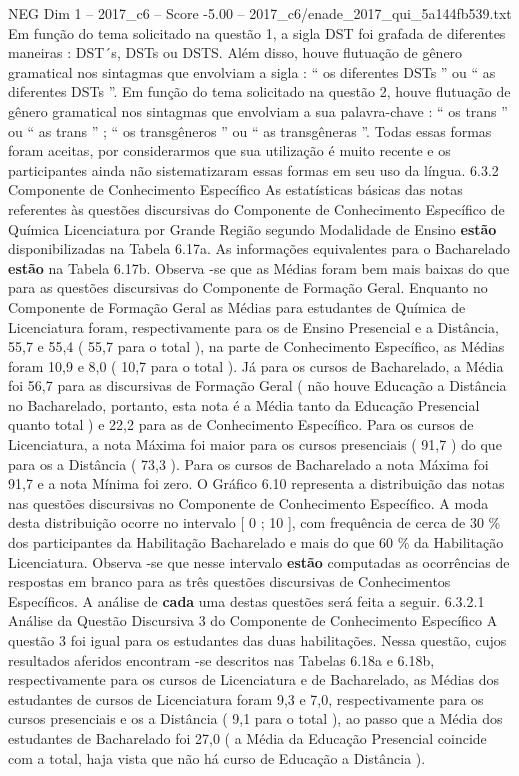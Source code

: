 \begin{textsample}{NEG Dim 1 – 2017\_c6 – Score -5.00 – 2017\_c6/enade\_2017\_qui\_5a144fb539.txt}
Em função do tema solicitado na questão 1, a sigla DST foi grafada de diferentes maneiras : DST´s, DSTs ou DSTS.
Além disso, houve flutuação de gênero gramatical nos sintagmas que envolviam a sigla : “ os diferentes DSTs ” ou “ as diferentes DSTs ”.
Em função do tema solicitado na questão 2, houve flutuação de gênero gramatical nos sintagmas que envolviam a sua palavra-chave : “ os trans ” ou “ as trans ” ; “ os transgêneros ” ou “ as transgêneras ”.
Todas essas formas foram aceitas, por considerarmos que sua utilização é muito recente e os participantes ainda não sistematizaram essas formas em seu uso da língua. 6.3.2 Componente de Conhecimento Específico As estatísticas básicas das notas referentes às questões discursivas do Componente de Conhecimento Específico de Química Licenciatura por Grande Região segundo Modalidade de Ensino \textbf{estão} disponibilizadas na Tabela 6.17a.
As informações equivalentes para o Bacharelado \textbf{estão} na Tabela 6.17b.
Observa -se que as Médias foram bem mais baixas do que para as questões discursivas do Componente de Formação Geral.
Enquanto no Componente de Formação Geral as Médias para estudantes de Química de Licenciatura foram, respectivamente para os de Ensino Presencial e a Distância, 55,7 e 55,4 ( 55,7 para o total ), na parte de Conhecimento Específico, as Médias foram 10,9 e 8,0 ( 10,7 para o total ).
Já para os cursos de Bacharelado, a Média foi 56,7 para as discursivas de Formação Geral ( não houve Educação a Distância no Bacharelado, portanto, esta nota é a Média tanto da Educação Presencial quanto total ) e 22,2 para as de Conhecimento Específico.
Para os cursos de Licenciatura, a nota Máxima foi maior para os cursos presenciais ( 91,7 ) do que para os a Distância ( 73,3 ).
Para os cursos de Bacharelado a nota Máxima foi 91,7 e a nota Mínima foi zero.
O Gráfico 6.10 representa a distribuição das notas nas questões discursivas no Componente de Conhecimento Específico.
A moda desta distribuição ocorre no intervalo [ 0 ; 10 ], com frequência de cerca de 30 \% dos participantes da Habilitação Bacharelado e mais do que 60 \% da Habilitação Licenciatura.
Observa -se que nesse intervalo \textbf{estão} computadas as ocorrências de respostas em branco para as três questões discursivas de Conhecimentos Específicos.
A análise de \textbf{cada} uma destas questões será feita a seguir. 6.3.2.1 Análise da Questão Discursiva 3 do Componente de Conhecimento Específico A questão 3 foi igual para os estudantes das duas habilitações.
Nessa questão, cujos resultados aferidos encontram -se descritos nas Tabelas 6.18a e 6.18b, respectivamente para os cursos de Licenciatura e de Bacharelado, as Médias dos estudantes de cursos de Licenciatura foram 9,3 e 7,0, respectivamente para os cursos presenciais e os a Distância ( 9,1 para o total ), ao passo que a Média dos estudantes de Bacharelado foi 27,0 ( a Média da Educação Presencial coincide com a total, haja vista que não há curso de Educação a Distância ).

\end{textsample}

